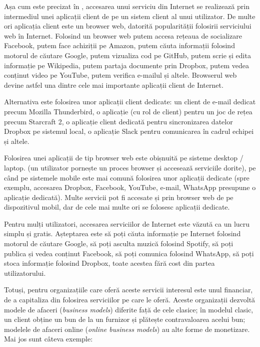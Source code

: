 Așa cum este precizat în , accesarea unui serviciu din Internet se realizează prin intermediul unei aplicații client de pe un sistem client al unui utilizator.
De multe ori aplicația client este un browser web, datorită popularității folosirii serviciului web în Internet.
Folosind un browser web putem accesa rețeaua de socializare Facebook, putem face achiziții pe Amazon, putem căuta informații folosind motorul de căutare Google, putem vizualiza cod pe GitHub, putem scrie și edita informație pe Wikipedia, putem partaja documente prin Dropbox, putem vedea conținut video pe YouTube, putem verifica e-mailul și altele.
Browserul web devine astfel una dintre cele mai importante aplicații client de Internet.

Alternativa este folosirea unor aplicații client dedicate: un client de e-mail dedicat precum Mozilla Thunderbird, o aplicație (cu rol de client) pentru un joc de rețea precum Starcraft 2, o aplicație client dedicată pentru sincronizarea datelor Dropbox pe sistemul local, o aplicație Slack pentru comunicarea în cadrul echipei și altele.

Folosirea unei aplicații de tip browser web este obișnuită pe sisteme desktop / laptop.
(un utilizator pornește un proces browser și accesează serviciile dorite), pe când pe sistemele mobile este mai comună
folosirea unor aplicații dedicate
(spre exemplu, accesarea Dropbox, Facebook, YouTube, e-mail, WhatsApp presupune o aplicație dedicată).
Multe servicii pot fi accesate și prin browser web de pe dispozitivul mobil, dar de cele mai multe ori se folosesc aplicații dedicate.

Pentru mulți utilizatori, accesarea serviciilor de Internet este văzută ca un lucru simplu și gratis.
Așteptarea este să poți căuta informație pe Internet folosind motorul de căutare Google, să poți asculta muzică folosind Spotify, să poți publica și vedea conținut Facebook, să poți comunica folosind WhatsApp, să poți stoca informație folosind Dropbox, toate acestea fără cost din partea utilizatorului.

Totuși, pentru organizațiile care oferă aceste servicii interesul este unul financiar, de a capitaliza din folosirea serviciilor pe care le oferă.
Aceste organizații dezvoltă modele de afaceri (\textit{business models}) diferite față de cele clasice;
în modelul clasic, un client obține un bun de la un furnizor și plătește contravaloarea acelui bun;
modelele de afaceri online (\textit{online business models}) au alte forme de monetizare.
Mai jos sunt câteva exemple:

